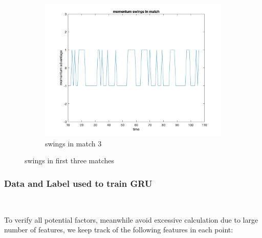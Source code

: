 \begin{figure}[H]
\begin{subfigure}[b]{0.34\textwidth}
        \includegraphics[width=\linewidth]{mainmatter/imgs/swing_match3.png}
        \caption{swings in match 3}
    \end{subfigure}
    \caption{swings in first three matches}
    \label{fig:swings in matches}
\end{figure}


\subsubsection{Data and Label used to train GRU}~{}

To verify all potential factors, meanwhile avoid excessive calculation due to large number of features, we keep track of the following features in each point:

